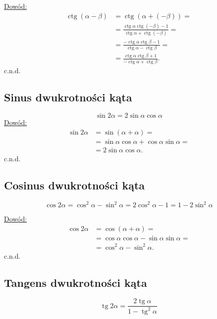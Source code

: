 \documentclass[12pt,a4paper,fleqn]{article}
\DeclareMathOperator{\tg}{tg}
\DeclareMathOperator{\ctg}{ctg}
\begin{document}
		\underline{Dowód:}\noindent
		\begin{align*}
\ctg (\alpha - \beta) &= \ctg(\alpha+(-\beta)) = \\
					  &= \frac{\ctg\alpha\ctg(-\beta)-1}{\ctg\alpha+\ctg(-\beta)} =\\
					  &= \frac{-\ctg\alpha\ctg\beta-1}{\ctg\alpha-\ctg\beta} =\\
					  &= \frac{\ctg\alpha\ctg\beta+1}{-\ctg\alpha+\ctg\beta}.
		\end{align*}
		c.n.d.
		\subsection{Sinus dwukrotności kąta}
		\begin{equation*}
			\sin2\alpha = 2\sin\alpha\cos\alpha
		\end{equation*}
		\underline{Dowód:} \noindent
		\begin{align*}
			\sin2\alpha &= \sin(\alpha+\alpha) =\\
						&= \sin\alpha\cos\alpha + \cos\alpha\sin\alpha =\\
						&= 2\sin\alpha\cos\alpha.
		\end{align*}
		c.n.d.
		\subsection{Cosinus dwukrotności kąta}
		\begin{equation*}
			\cos2\alpha = \cos^2\alpha-\sin^2\alpha = 2\cos^2\alpha - 1 = 1-2\sin^2\alpha
		\end{equation*}
		
		\underline{Dowód:} \noindent
		\begin{align*}
			\cos2\alpha &= \cos(\alpha+\alpha) =\\
						&= \cos\alpha\cos\alpha - \sin\alpha\sin\alpha =\\
						&= \cos^2\alpha-\sin^2\alpha.
		\end{align*}
		c.n.d.

		\subsection{Tangens dwukrotności kąta}
		\begin{equation*}
			\tg2\alpha = \frac{2\tg \alpha}{1 - \tg^2 \alpha}
		\end{equation*}
		
\end{document}

